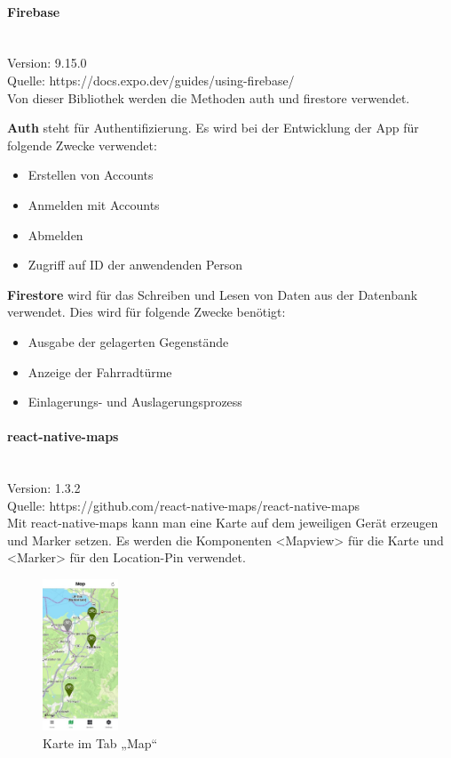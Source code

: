\bigskip

\paragraph{Firebase}\mbox{}\\
Version: 9.15.0\\
Quelle: https://docs.expo.dev/guides/using-firebase/\\
Von dieser Bibliothek werden die Methoden auth und firestore verwendet.\\
\smallskip

\noindent\textbf{Auth} steht für Authentifizierung. Es wird bei der Entwicklung der App für folgende Zwecke verwendet:
\begin{itemize}
  \item Erstellen von Accounts
  \item Anmelden mit Accounts
  \item Abmelden
  \item Zugriff auf ID der anwendenden Person
\end{itemize}
\medskip
\noindent\textbf{Firestore} wird für das Schreiben und Lesen von Daten aus der Datenbank verwendet. Dies wird für folgende Zwecke benötigt:

\begin{itemize}
  \item Ausgabe der gelagerten Gegenstände
  \item Anzeige der Fahrradtürme
  \item Einlagerungs- und Auslagerungsprozess
\end{itemize}

\bigskip

\paragraph{react-native-maps}\mbox{}\\
Version: 1.3.2\\
Quelle: https://github.com/react-native-maps/react-native-maps\\
Mit react-native-maps kann man eine Karte auf dem jeweiligen Gerät erzeugen und Marker setzen. Es werden die Komponenten <Mapview> für die Karte und <Marker> für den \Gls{Location-Pin} verwendet.

\begin{figure}[H]
  \centering
  \includegraphics[width=0.2\textwidth]{images/app-screenshots/tabmap.jpg}
  \caption{Karte im Tab „Map“}
  \label{fig:tabmap}
\end{figure}

